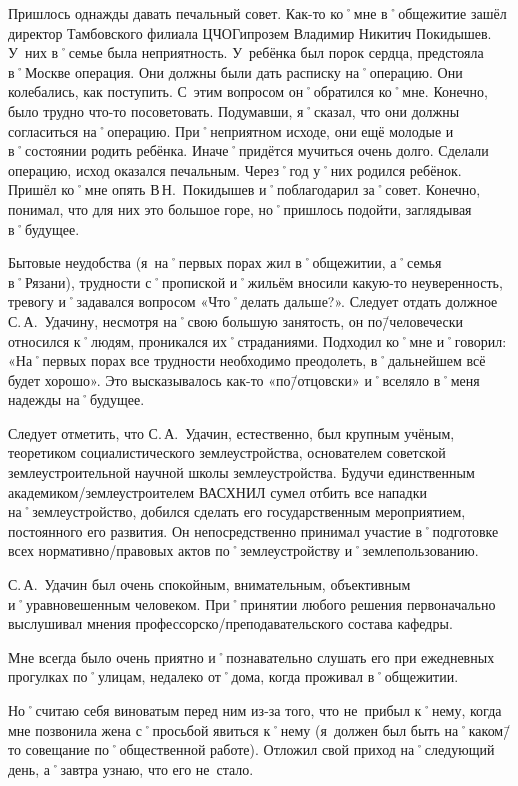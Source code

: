 Пришлось однажды давать печальный совет. Как-то ко˚мне в˚общежитие зашёл директор Тамбовского филиала ЦЧОГипрозем Владимир Никитич Покидышев. У~них в˚семье была неприятность. У~ребёнка был порок сердца, предстояла в˚Москве операция. Они должны были дать расписку на˚операцию. Они колебались, как поступить. С~этим вопросом он˚обратился ко˚мне. Конечно, было трудно что-то посоветовать. Подумавши, я˚сказал, что они должны согласиться на˚операцию. При˚неприятном исходе, они ещё молодые и в˚состоянии родить ребёнка. Иначе˚придётся мучиться очень долго. Сделали операцию, исход оказался печальным. Через˚год у˚них родился ребёнок. Пришёл ко˚мне опять В\,Н.~Покидышев и˚поблагодарил за˚совет. Конечно, понимал, что для них это большое горе, но˚пришлось подойти, заглядывая в˚будущее.

Бытовые неудобства (я~на˚первых порах жил в˚общежитии, а˚семья в˚Рязани), трудности с˚пропиской и˚жильём вносили какую-то неуверенность, тревогу и˚задавался вопросом «Что˚делать дальше?». Следует отдать должное С.\,А.~Удачину, несмотря на˚свою большую занятость, он по\=/человечески относился к˚людям, проникался их˚страданиями. Подходил ко˚мне и˚говорил: «На˚первых порах все трудности необходимо преодолеть, в˚дальнейшем всё будет хорошо». Это высказывалось как-то «по\=/отцовски» и˚вселяло в˚меня надежды на˚будущее.

Следует отметить, что С.\,А.~Удачин, естественно, был крупным учёным, теоретиком социалистического землеустройства, основателем советской землеустроительной научной школы землеустройства. Будучи единственным академиком\-/землеустроителем ВАСХНИЛ сумел отбить все нападки на˚землеустройство, добился сделать его государственным мероприятием, постоянного его развития. Он непосредственно принимал участие в˚подготовке всех нормативно\-/правовых актов по˚землеустройству и˚землепользованию. 

С.\,А.~Удачин был очень спокойным, внимательным, объективным и˚уравновешенным человеком. При˚принятии любого решения первоначально выслушивал мнения профессорско\-/преподавательского состава кафедры. 

Мне всегда было очень приятно и˚познавательно слушать его при ежедневных прогулках по˚улицам, недалеко от˚дома, когда проживал в˚общежитии.

Но˚считаю себя виноватым перед ним из-за того, что не~прибыл к˚нему, когда мне позвонила жена с˚просьбой явиться к˚нему (я~должен был быть на˚каком\=/то совещание по˚общественной работе). Отложил свой приход на˚следующий день, а˚завтра узнаю, что его не~стало.

